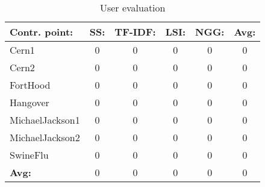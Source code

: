 
\begin{table*}[htbp]
\centering
\begin{tabular}{l|c|c|c|c|c}

\textbf{Contr. point:} & \textbf{SS:} & \textbf{TF-IDF:} & \textbf{LSI:} & \textbf{NGG:} & \textbf{Avg:} \\

\hline

Cern1 & 0 & 0 & 0 & 0 & 0 \\
\hline
Cern2 & 0 & 0 & 0 & 0 & 0 \\
\hline
FortHood & 0 & 0 & 0 & 0 & 0 \\
\hline
Hangover & 0 & 0 & 0 & 0 & 0 \\
\hline
MichaelJackson1 & 0 & 0 & 0 & 0 & 0 \\
\hline
MichaelJackson2 & 0 & 0 & 0 & 0 & 0 \\
\hline
SwineFlu & 0 & 0 & 0 & 0 & 0 \\
\hline
\textbf{Avg:} & 0 & 0 & 0 & 0 & 0 \\
\hline

\end{tabular}
\caption{User evaluation}
\label{tab:UserEvaluation}
\end{table*}
